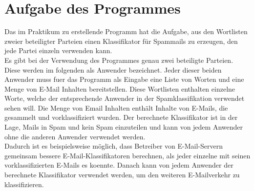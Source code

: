 \documentclass{article}
\begin{document}
\section{Aufgabe des Programmes}
  Das im Praktikum zu erstellende Programm hat die Aufgabe, aus 
den Wortlisten zweier beteiligter Parteien einen Klassifikator 
f\"ur Spammails zu erzeugen, den jede Partei einzeln verwenden kann.\\
  Es gibt bei der Verwendung des Programmes genau zwei beteiligte Parteien.
Diese werden im folgenden als Anwender bezeichnet. Jeder dieser beiden
Anwender muss fuer das Programm als Eingabe eine Liste von Worten und eine
Menge von E-Mail Inhalten bereitstellen.
  Diese Wortlisten enthalten einzelne Worte, welche der entsprechende
Anwender in der Spamklassifikation verwendet sehen will.
  Die Menge von Email Inhalten enth\"alt Inhalte von E-Mails, die gesammelt
und vorklassifiziert wurden.
  Der berechnete Klassifikator ist in der Lage, Mails in Spam und kein Spam
einzuteilen und kann von jedem Anwender ohne die anderen Anwender verwendet
werden.\\
  Dadurch ist es beispielsweise m\"oglich, dass Betreiber von E-Mail-Servern
gemeinsam bessere E-Mail-Klassifikatoren berechnen, als jeder einzelne mit
seinen vorklassifizierten E-Mails es koennte. Danach kann von jedem
Anwender der berechnete Klassifikator verwendet werden, um den weiteren 
E-Mailverkehr zu klassifizieren.\\
\end{document}
